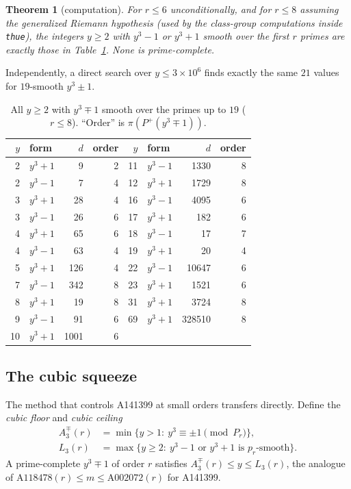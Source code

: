 \documentclass[11pt]{article}
\newtheorem{theorem}{Theorem}[section]
\theoremstyle{definition}
\theoremstyle{remark}
\newcommand{\Pplus}{P^{+}}
\begin{document}
\begin{theorem}[computation]\label{thm:k3list}
For $r\le6$ unconditionally, and for $r\le8$ assuming the generalized Riemann
hypothesis (used by the class-group computations inside \texttt{thue}), the
integers $y\ge2$ with $y^3-1$ or $y^3+1$ smooth over the first $r$ primes are
exactly those in Table~\ref{tab:k3list}. None is prime-complete.
\end{theorem}

Independently, a direct search over $y\le3\times10^6$ finds exactly the same
$21$ values for $19$-smooth $y^3\pm1$.

\begin{table}[ht]
\centering
\caption{All $y\ge2$ with $y^3\mp1$ smooth over the primes up to $19$
($r\le8$). ``Order'' is $\pi(\Pplus(y^3\mp1))$.}
\label{tab:k3list}
\small
\begin{tabular}{rlrr@{\qquad}rlrr}
\toprule
$y$ & form & $d$ & order & $y$ & form & $d$ & order\\
\midrule
2 & $y^3+1$ & 9 & 2 & 11 & $y^3-1$ & 1330 & 8\\
2 & $y^3-1$ & 7 & 4 & 12 & $y^3+1$ & 1729 & 8\\
3 & $y^3+1$ & 28 & 4 & 16 & $y^3-1$ & 4095 & 6\\
3 & $y^3-1$ & 26 & 6 & 17 & $y^3+1$ & 182 & 6\\
4 & $y^3+1$ & 65 & 6 & 18 & $y^3-1$ & 17 & 7\\
4 & $y^3-1$ & 63 & 4 & 19 & $y^3+1$ & 20 & 4\\
5 & $y^3+1$ & 126 & 4 & 22 & $y^3-1$ & 10647 & 6\\
7 & $y^3-1$ & 342 & 8 & 23 & $y^3+1$ & 1521 & 6\\
8 & $y^3+1$ & 19 & 8 & 31 & $y^3+1$ & 3724 & 8\\
9 & $y^3-1$ & 91 & 6 & 69 & $y^3+1$ & 328510 & 8\\
10 & $y^3+1$ & 1001 & 6 & & & & \\
\bottomrule
\end{tabular}
\end{table}

\subsection{The cubic squeeze}
The method that controls A141399 at small orders transfers directly. Define the
\emph{cubic floor} and \emph{cubic ceiling}
\begin{align*}
A_3^{\mp}(r)&=\min\{y>1:\ y^3\equiv\pm1\!\!\pmod{P_r}\},\\
L_3(r)&=\max\{y\ge2:\ y^3-1\text{ or }y^3+1\text{ is }p_r\text{-smooth}\}.
\end{align*}
A prime-complete $y^3\mp1$ of order $r$ satisfies
$A_3^{\mp}(r)\le y\le L_3(r)$, the analogue of
$\mathrm{A118478}(r)\le m\le\mathrm{A002072}(r)$ for A141399.
\end{document}
